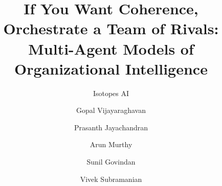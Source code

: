 \documentclass[sigconf]{acmart}
\begin{document}
\title{If You Want Coherence, Orchestrate a Team of Rivals: Multi-Agent Models of Organizational Intelligence}

\ifdefined\skipauthors
  \author{Isotopes AI}
\else
\author{Gopal Vijayaraghavan}

\author{Prasanth Jayachandran}

\author{Arun Murthy}

\author{Sunil Govindan}

\author{Vivek Subramanian}

\renewcommand{\shortauthors}{Vijayaraghavan et al.}
\fi
\end{document}
